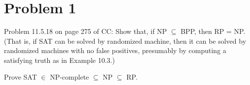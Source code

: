 \documentclass[twoside,11pt]{homework}
\date{\today} %
\begin{document}
\maketitle

\section*{Problem 1}

Problem 11.5.18 on page 275 of CC:
Show that, if NP $\subseteq$ BPP, then RP = NP.
(That is, if SAT can be solved by randomized machine, then it can be solved by
randomized machines with no false positives, presumably by computing a
satisfying truth as in Example 10.3.)

\begin{goal}
  Prove SAT $\in$ NP-complete $\subseteq$ NP $\subseteq$ RP.
\end{goal}
\end{document}
